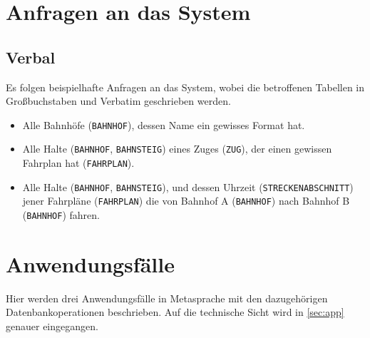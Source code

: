 \section{Anfragen an das System}
\subsection{Verbal}
Es folgen beispielhafte Anfragen an das System, wobei die betroffenen Tabellen in Großbuchstaben und Verbatim geschrieben werden.

\begin{itemize}
    \item Alle Bahnhöfe (\texttt{BAHNHOF}), dessen Name ein gewisses Format hat.
    \item Alle Halte (\texttt{BAHNHOF}, \texttt{BAHNSTEIG}) eines Zuges (\texttt{ZUG}), der einen gewissen Fahrplan
    hat (\texttt{FAHRPLAN}).
    \item Alle Halte (\texttt{BAHNHOF}, \texttt{BAHNSTEIG}), und dessen Uhrzeit (\texttt{STRECKENABSCHNITT})
    jener Fahrpläne (\texttt{FAHRPLAN}) die von Bahnhof A (\texttt{BAHNHOF}) nach Bahnhof B (\texttt{BAHNHOF})
    fahren.
\end{itemize}

\section{Anwendungsfälle} \label{sec:awf}
Hier werden drei Anwendungsfälle in Metasprache mit den dazugehörigen Datenbankoperationen beschrieben. Auf die technische Sicht wird in \ref{sec:app} genauer eingegangen.
